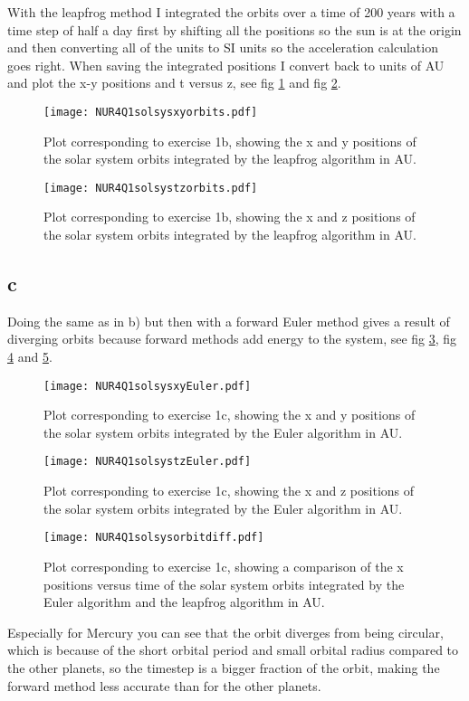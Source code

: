 With the leapfrog method I integrated the orbits over a time of 200 years with a time step of half a day first by shifting all the positions so the sun is at the origin and then converting all of the units to SI units so the acceleration calculation goes right. When saving the integrated positions I convert back to units of AU and plot the x-y positions and t versus z, see fig \ref{fig:fig13} and fig \ref{fig:fig14}.

\begin{figure}[h!]
  \centering
  \texttt{[image: NUR4Q1solsysxyorbits.pdf]}
  \caption{Plot corresponding to exercise 1b, showing the x and y positions of the solar system orbits integrated by the leapfrog algorithm in AU.}
  \label{fig:fig13}
\end{figure} 


\begin{figure}[h!]
  \centering
  \texttt{[image: NUR4Q1solsystzorbits.pdf]}
  \caption{Plot corresponding to exercise 1b, showing the x and z positions of the solar system orbits integrated by the leapfrog algorithm in AU.}
  \label{fig:fig14}
\end{figure} 

\subsection*{c}

Doing the same as in b) but then with a forward Euler method gives a result of diverging orbits because forward methods add energy to the system, see fig \ref{fig:fig15}, fig \ref{fig:fig16} and \ref{fig:fig17}.

\begin{figure}[h!]
  \centering
  \texttt{[image: NUR4Q1solsysxyEuler.pdf]}
  \caption{Plot corresponding to exercise 1c, showing the x and y positions of the solar system orbits integrated by the Euler algorithm in AU.}
  \label{fig:fig15}
\end{figure} 


\begin{figure}[h!]
  \centering
  \texttt{[image: NUR4Q1solsystzEuler.pdf]}
  \caption{Plot corresponding to exercise 1c, showing the x and z positions of the solar system orbits integrated by the Euler algorithm in AU.}
  \label{fig:fig16}
\end{figure} 


\begin{figure}[h!]
  \centering
  \texttt{[image: NUR4Q1solsysorbitdiff.pdf]}
  \caption{Plot corresponding to exercise 1c, showing a comparison of the x positions versus time of the solar system orbits integrated by the Euler algorithm and the leapfrog algorithm in AU.}
  \label{fig:fig17}
\end{figure} 


Especially for Mercury you can see that the orbit diverges from being circular, which is because of the short orbital period and small orbital radius compared to the other planets, so the timestep is a bigger fraction of the orbit, making the forward method less accurate than for the other planets.

